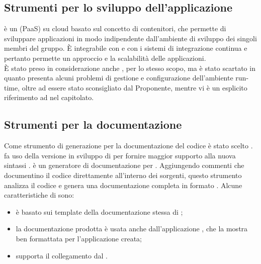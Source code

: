 \subsection{Strumenti per lo sviluppo dell'applicazione}
\textbf{} è un  (PaaS) su cloud basato sul concetto di contenitori, che permette di sviluppare applicazioni in modo indipendente dall'ambiente di sviluppo dei singoli membri del gruppo. \`{E} integrabile con  e con i sistemi di integrazione continua e pertanto permette un approccio  e la scalabilità delle applicazioni.\\
\`{E} stato preso in considerazione anche , per lo stesso scopo, ma è stato scartato in quanto presenta alcuni problemi di gestione e configurazione dell'ambiente run-time, oltre ad essere stato sconsigliato dal Proponente, mentre vi è un esplicito riferimento ad  nel capitolato.

\subsection{Strumenti per la documentazione}
Come strumento di generazione per la documentazione del codice è stato scelto \textbf{}.\\
 fa uso della versione in sviluppo di \textbf{} per fornire maggior supporto alla nuova sintassi .
 è un generatore di documentazione  per . Aggiungendo commenti che documentino il codice direttamente all'interno dei sorgenti, questo strumento analizza il codice e genera una documentazione completa in formato .
Alcune caratteristiche di  sono:
\begin{itemize}
	\item è basato sui template della documentazione stessa di ;
	\item la documentazione prodotta è usata anche dall'applicazione , che la mostra ben formattata per l'applicazione creata;
	\item supporta il collegamento dal  .
\end{itemize}

